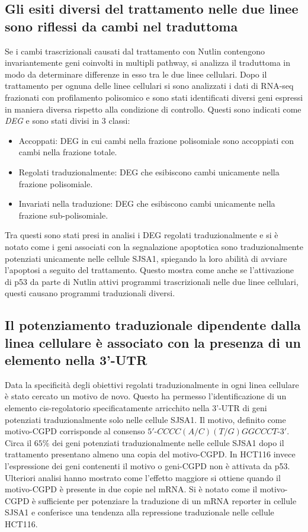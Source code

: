   \subsection{Gli esiti diversi del trattamento nelle due linee sono riflessi da cambi nel traduttoma}
  Se i cambi trascrizionali causati dal trattamento con Nutlin contengono invariantemente geni coinvolti in multipli pathway, si analizza il traduttoma in modo da determinare differenze in esso tra le due linee cellulari.
  Dopo il trattamento per ognuna delle linee cellulari si sono analizzati i dati di RNA-seq frazionati con profilamento polisomico e sono stati identificati diversi geni espressi in maniera diversa rispetto alla condizione di controllo.
  Questi sono indicati come \emph{DEG} e sono stati divisi in $3$ classi:
  \begin{itemize}
    \item Accoppati: DEG in cui cambi nella frazione polisomiale sono accoppiati con cambi nella frazione totale.
    \item Regolati traduzionalmente: DEG che esibiscono cambi unicamente nella frazione polisomiale.
    \item Invariati nella traduzione: DEG che esibiscono cambi unicamente nella frazione sub-polisomiale.
  \end{itemize}
  Tra questi sono stati presi in analisi i DEG regolati traduzionalmente e si \`e notato come i geni associati con la segnalazione apoptotica sono traduzionalmente potenziati unicamente nelle cellule SJSA1, spiegando la loro abilit\`a di avviare l'apoptosi a seguito del trattamento.
  Questo mostra come anche se l'attivazione di p53 da parte di Nutlin attivi programmi trascrizionali nelle due linee cellulari, questi causano programmi traduzionali diversi.

  \subsection{Il potenziamento traduzionale dipendente dalla linea cellulare \`e associato con la presenza di un elemento nella 3'-UTR}
  Data la specificit\`a degli obiettivi regolati traduzionalmente in ogni linea cellulare \`e stato cercato un motivo de novo.
  Questo ha permesso l'identificazione di un elemento cis-regolatorio specificatamente arricchito nella 3'-UTR di geni potenziati traduzionalmente solo nelle cellule SJSA1.
  Il motivo, definito come motivo-CGPD corrisponde al consenso $5'$-$CCCC(A/C)(T/G)GGCCCT$-$3'$.
  Circa il $65\%$ dei geni potenziati traduzionalmente nelle cellule SJSA1 dopo il trattamento presentano almeno una copia del motivo-CGPD.
  In HCT116 invece l'espressione dei geni contenenti il motivo o geni-CGPD non \`e attivata da p53.\\
  Ulteriori analisi hanno mostrato come l'effetto maggiore si ottiene quando il motivo-CGPD \`e presente in due copie nel mRNA.
  Si \`e notato come il motivo-CGPD \`e sufficiente per potenziare la traduzione di un mRNA reporter in cellule SJSA1 e conferisce una tendenza alla repressione traduzionale nelle cellule HCT116.

